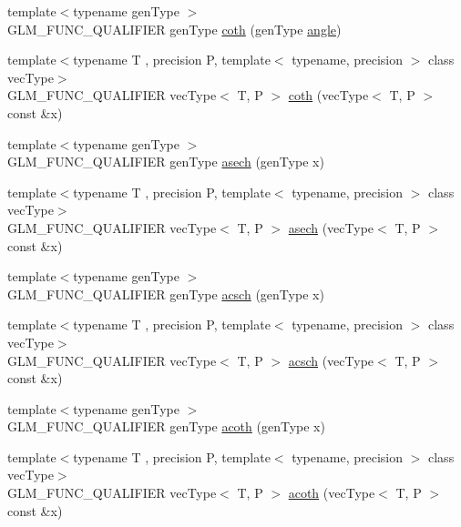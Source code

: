 \begin{DoxyCompactItemize}
\item 
{\footnotesize template$<$typename gen\+Type $>$ }\\G\+L\+M\+\_\+\+F\+U\+N\+C\+\_\+\+Q\+U\+A\+L\+I\+F\+I\+E\+R gen\+Type \hyperlink{namespaceglm_aa834c9345990c5373d6358732ea2fc03}{coth} (gen\+Type \hyperlink{group__gtc__quaternion_gad4a4448baedb198b2b1e7880d2544dc9}{angle})
\item 
{\footnotesize template$<$typename T , precision P, template$<$ typename, precision $>$ class vec\+Type$>$ }\\G\+L\+M\+\_\+\+F\+U\+N\+C\+\_\+\+Q\+U\+A\+L\+I\+F\+I\+E\+R vec\+Type$<$ T, P $>$ \hyperlink{namespaceglm_ab851ec044cf6fe8cecb0c3d15359b110}{coth} (vec\+Type$<$ T, P $>$ const \&x)
\item 
{\footnotesize template$<$typename gen\+Type $>$ }\\G\+L\+M\+\_\+\+F\+U\+N\+C\+\_\+\+Q\+U\+A\+L\+I\+F\+I\+E\+R gen\+Type \hyperlink{namespaceglm_a8e7a1d844fe8d81ceb0b6642e026ae2f}{asech} (gen\+Type x)
\item 
{\footnotesize template$<$typename T , precision P, template$<$ typename, precision $>$ class vec\+Type$>$ }\\G\+L\+M\+\_\+\+F\+U\+N\+C\+\_\+\+Q\+U\+A\+L\+I\+F\+I\+E\+R vec\+Type$<$ T, P $>$ \hyperlink{namespaceglm_afa41f1f0dd76e071da4cece561ae17f2}{asech} (vec\+Type$<$ T, P $>$ const \&x)
\item 
{\footnotesize template$<$typename gen\+Type $>$ }\\G\+L\+M\+\_\+\+F\+U\+N\+C\+\_\+\+Q\+U\+A\+L\+I\+F\+I\+E\+R gen\+Type \hyperlink{namespaceglm_ae63e088add8044453b4a0dc31ec19ca6}{acsch} (gen\+Type x)
\item 
{\footnotesize template$<$typename T , precision P, template$<$ typename, precision $>$ class vec\+Type$>$ }\\G\+L\+M\+\_\+\+F\+U\+N\+C\+\_\+\+Q\+U\+A\+L\+I\+F\+I\+E\+R vec\+Type$<$ T, P $>$ \hyperlink{namespaceglm_a1c7038712456676487a9be253281aa72}{acsch} (vec\+Type$<$ T, P $>$ const \&x)
\item 
{\footnotesize template$<$typename gen\+Type $>$ }\\G\+L\+M\+\_\+\+F\+U\+N\+C\+\_\+\+Q\+U\+A\+L\+I\+F\+I\+E\+R gen\+Type \hyperlink{namespaceglm_ae3076334d7333af3a8ebe33bff68f53f}{acoth} (gen\+Type x)
\item 
{\footnotesize template$<$typename T , precision P, template$<$ typename, precision $>$ class vec\+Type$>$ }\\G\+L\+M\+\_\+\+F\+U\+N\+C\+\_\+\+Q\+U\+A\+L\+I\+F\+I\+E\+R vec\+Type$<$ T, P $>$ \hyperlink{namespaceglm_a51bfb25efbc539ee80486ea96690359a}{acoth} (vec\+Type$<$ T, P $>$ const \&x)

\end{DoxyCompactItemize}
